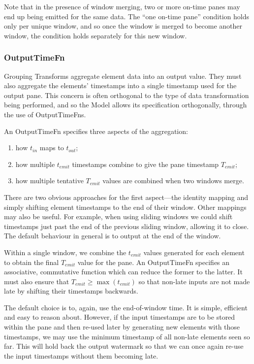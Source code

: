 \footnotetext
{
Note that in the presence of window merging, two or more on-time panes may end up being emitted for the same data.
The ``one on-time pane'' condition holds only per unique window, and so once the window is merged to become another window, the condition holds separately for this new window.
}

\subsubsection{OutputTimeFn}
Grouping Transforms aggregate element data into an output value.
They must also aggregate the elements' timestamps into a single timestamp used for the output pane.
This concern is often orthogonal to the type of data transformation being performed, and so the Model allows its specification orthogonally, through the use of OutputTimeFns.

An OutputTimeFn specifies three aspects of the aggregation:
\begin{enumerate}
	\item how $t_{\mathit{in}}$ maps to $t_{\mathit{out}}$;
	\item how multiple $t_{\mathit{emit}}$ timestamps combine to give the pane timestamp $T_{\mathit{emit}}$;
	\item how multiple tentative $T_{\mathit{emit}}$ values are combined when two windows merge.
\end{enumerate}

There are two obvious approaches for the first aspect---the identity mapping and simply shifting element timestamps to the end of their window.
Other mappings may also be useful.
For example, when using sliding windows we could shift timestamps just past the end of the previous sliding window, allowing it to close.
The default behaviour in general is to output at the end of the window.

Within a single window, we combine the $t_{\mathit{emit}}$ values generated for each element to obtain the final $T_{\mathit{emit}}$ value for the pane.
An OutputTimeFn specifies an associative, commutative function which can reduce the former to the latter.
It must also ensure that $T_{\mathit{emit}} \geq \max(t_{\mathit{emit}})$ so that non-late inputs are not made late by shifting their timestamps backwards.

The default choice is to, again, use the end-of-window time.
It is simple, efficient and easy to reason about.
However, if the input timestamps are to be stored within the pane and then re-used later by generating new elements with those timestamps, we may use the minimum timestamp of all non-late elements seen so far.
This will hold back the output watermark so that we can once again re-use the input timestamps without them becoming late.


